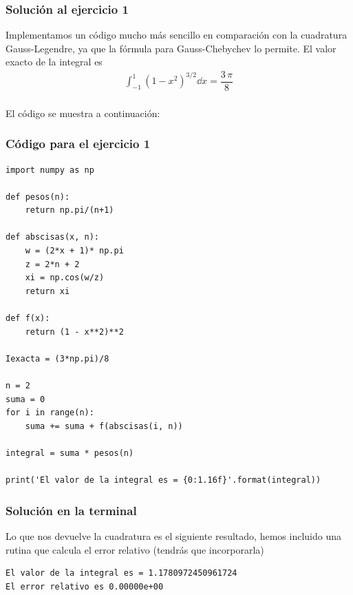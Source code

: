 \begin{frame}
\frametitle{Solución al ejercicio 1}
Implementamos un código mucho más sencillo en comparación con la cuadratura Gauss-Legendre, ya que la fórmula para Gauss-Chebychev lo permite. El valor exacto de la integral es
\begin{align*}
\int_{-1}^{1} (1 - x^{2})^{3/2} \dd{x} = \dfrac{3 \, \pi}{8}
\end{align*}
\\
\bigskip
El código se muestra a continuación:
\end{frame}
\begin{frame}
\frametitle{Código para el ejercicio 1}
\begin{lstlisting}[caption=Código para la fórmula Gauss-Legendre, style=FormattedNumber, basicstyle=\linespread{1.1}\ttfamily=\tiny, columns=fullflexible]
import numpy as np

def pesos(n):
	return np.pi/(n+1)

def abscisas(x, n):
	w = (2*x + 1)* np.pi
	z = 2*n + 2
	xi = np.cos(w/z)
	return xi

def f(x):
	return (1 - x**2)**2

Iexacta = (3*np.pi)/8

n = 2
suma = 0
for i in range(n):
	suma += suma + f(abscisas(i, n))

integral = suma * pesos(n)

print('El valor de la integral es = {0:1.16f}'.format(integral))
\end{lstlisting}
\end{frame}
\begin{frame}[fragile]
\frametitle{Solución en la terminal}
Lo que nos devuelve la cuadratura es el siguiente resultado, hemos incluido una rutina que calcula el error relativo (tendrás que incorporarla)
\fontsize{12}{12}\selectfont
\begin{verbatim}
El valor de la integral es = 1.1780972450961724
El error relativo es 0.00000e+00
\end{verbatim}
\end{frame}
